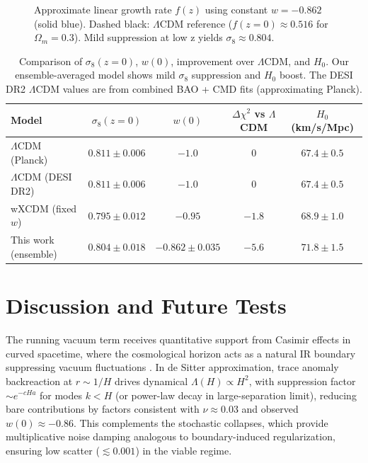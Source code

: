 \documentclass[preprint]{aastex7}
\begin{document}
\begin{figure}
\caption{Approximate linear growth rate \( f(z) \) using constant \( w = -0.862 \) (solid blue). Dashed black: $\Lambda$CDM reference (\( f(z=0) \approx 0.516 \) for \( \Omega_m = 0.3 \)). Mild suppression at low z yields \( \sigma_8 \approx 0.804 \).}
\label{fig:growth_rate}
\end{figure}

\startlongtable
\begin{table}
\centering
\caption{Comparison of \( \sigma_8(z=0) \), \( w(0) \), improvement over $\Lambda$CDM, and \( H_0 \). Our ensemble-averaged model shows mild \( \sigma_8 \) suppression and \( H_0 \) boost. The DESI DR2 $\Lambda$CDM values are from combined BAO + CMD fits (approximating Planck).}
\label{tab:sigma8}
\begin{tabular}{lcccc}
\toprule
Model & \( \sigma_8(z=0) \) & \( w(0) \) & \( \Delta\chi^2 \) vs $\Lambda$CDM & \( H_0 \) (km/s/Mpc) \\
\midrule
$\Lambda$CDM (Planck) & $0.811 \pm 0.006$ & \( -1.0 \) & 0 & $67.4 \pm 0.5$ \\
$\Lambda$CDM (DESI DR2) & $0.811 \pm 0.006$ & \( -1.0 \) & 0 & $67.4 \pm 0.5$ \\
wXCDM (fixed \( w \)) & $0.795 \pm 0.012$ & \( -0.95 \) & \( -1.8 \) & $68.9 \pm 1.0$ \\
This work (ensemble) & $0.804 \pm 0.018$ & \( -0.862 \pm 0.035 \) & \( -5.6 \) & $71.8 \pm 1.5$ \\
\bottomrule
\end{tabular}
\end{table}

\section{Discussion and Future Tests}
The running vacuum term receives quantitative support from Casimir effects in curved spacetime, where the cosmological horizon acts as a natural IR boundary suppressing vacuum fluctuations \citep{Mottola2010,Saharian2011}. In de Sitter approximation, trace anomaly backreaction at \( r \sim 1/H \) drives dynamical \( \Lambda(H) \propto H^2 \), with suppression factor \( \sim e^{-c H a} \) for modes \( k < H \) (or power-law decay in large-separation limit), reducing bare contributions by factors consistent with \( \nu \approx 0.03 \) and observed \( w(0) \approx -0.86 \). This complements the stochastic collapses, which provide multiplicative noise damping analogous to boundary-induced regularization, ensuring low scatter (\( \lesssim 0.001 \)) in the viable regime.
\end{document}
